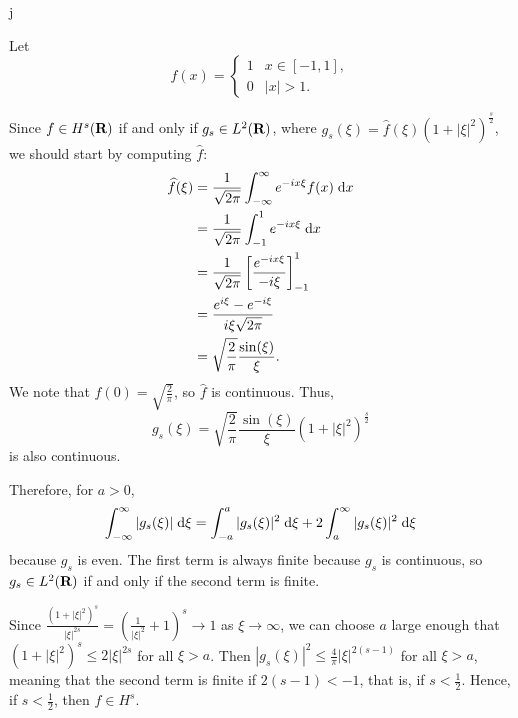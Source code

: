 j\documentclass{homework}
\begin{document}
	\maketitle
	
	Let
	\begin{equation}
		f(x) = \begin{cases}
			1 & x \in [-1, 1], \\
			0 & |x| > 1.
		\end{cases}
	\end{equation}
	
	\question Since $f \in H^s(\textnormal{\bf R})$ if and only if $g_s \in L^2(\textnormal{\bf R})$, where $g_s(\xi) = \widehat{f}(\xi)(1+|\xi|^2)^\frac{s}{2}$, we should start by computing $\widehat{f}$:
	\begin{align*}
		\widehat{f}(\xi) &= \frac{1}{\sqrt{2\pi}} \int_{-\infty}^\infty e^{-ix\xi}f(x)\;\text{d} x \\
		&= \frac{1}{\sqrt{2\pi}}\int_{-1}^1 e^{-ix\xi}\;\text{d} x \\
		&= \frac{1}{\sqrt{2\pi}}\left[\frac{e^{-ix\xi}}{-i\xi}\right]_{-1}^1 \\
		&= \frac{e^{i\xi} - e^{-i\xi}}{i\xi\sqrt{2\pi}}\\
		&= \sqrt{\frac{2}{\pi}}\frac{\sin(\xi)}{\xi}.
	\end{align*}
	We note that $\widehat{f}(0) = \sqrt{\frac{2}{\pi}}$, so $\widehat{f}$ is continuous. Thus,
	\begin{equation*}
		g_s(\xi) =\sqrt{\frac{2}{\pi}}\frac{\sin(\xi)}{\xi}(1+|\xi|^2)^\frac{s}{2}
	\end{equation*}
	is also continuous.
	
	Therefore, for $a > 0$,
	\begin{equation*}
		\int_{-\infty}^\infty |g_s(\xi)|\;\text{d}\xi = \int_{-a}^a |g_s(\xi)|^2\;\text{d}\xi + 2\int_{a}^\infty |g_s(\xi)|^2\;\text{d} \xi
	\end{equation*}
	because $g_s$ is even. The first term is always finite because $g_s$ is continuous, so $g_s \in L^2(\textnormal{\bf R})$ if and only if the second term is finite.
	
	Since $\frac{(1+|\xi|^2)^s}{|\xi|^{2s}} = \left(\frac{1}{|\xi|^2} + 1\right)^s \to 1$ as $\xi \to \infty$, we can choose $a$ large enough that $(1+|\xi|^2)^s \le 2|\xi|^{2s}$ for all $\xi > a$. Then $|g_s(\xi)|^2 \le \frac{4}{\pi}|\xi|^{2(s-1)}$ for all $\xi > a$, meaning that the second term is finite if $2(s-1) < -1$, that is, if $s < \frac{1}{2}$. Hence, if $s < \frac{1}{2}$, then $f \in H^s$.
	
\end{document}
